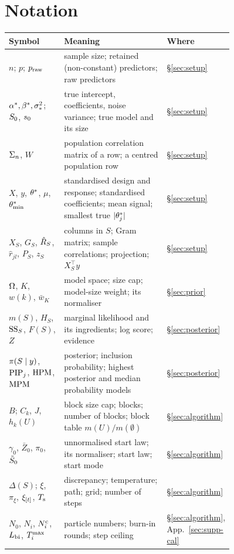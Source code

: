 \section{Notation}\label{app:notation}

{\small
\begin{longtable}{@{}p{0.26\linewidth}p{0.5\linewidth}l@{}}
\toprule
Symbol & Meaning & Where \\ \midrule \endhead
$n$; $p$; $p_{\mathrm{raw}}$ & sample size; retained (non-constant) predictors; raw predictors & \S\ref{sec:setup} \\
$\alpha^*,\beta^*,\sigma_*^2$; $S_0$, $s_0$ & true intercept, coefficients, noise variance; true model and its size & \S\ref{sec:setup} \\
$\Sigma_n$, $W$ & population correlation matrix of a row; a centred population row & \S\ref{sec:setup} \\
$X$, $y$, $\theta^*$, $\mu$, $\theta^*_{\min}$ & standardised design and response; standardised coefficients; mean signal; smallest true $\lvert \theta^*_j\rvert$ & \S\ref{sec:setup} \\
$X_S$, $G_S$, $\hat R_S$, $\hat r_{jl}$, $P_S$, $z_S$ & columns in $S$; Gram matrix; sample correlations; projection; $X_S^\top y$ & \S\ref{sec:setup} \\
$\Omega$, $K$, $w(k)$, $\bar w_K$ & model space; size cap; model-size weight; its normaliser & \S\ref{sec:prior} \\
$m(S)$, $H_S$, $\mathrm{SS}_S$, $F(S)$, $Z$ & marginal likelihood and its ingredients; log score; evidence & \S\ref{sec:posterior} \\
$\pi(S\mid y)$, $\mathrm{PIP}_j$, $\mathrm{HPM}$, $\mathrm{MPM}$ & posterior; inclusion probability; highest posterior and median probability models & \S\ref{sec:posterior} \\
$B$; $C_k$, $J$, $h_k(U)$ & block size cap; blocks; number of blocks; block table $m(U)/m(\emptyset)$ & \S\ref{sec:algorithm} \\
$\gamma_0$, $\bar Z_0$, $\pi_0$, $\tilde S_0$ & unnormalised start law; its normaliser; start law; start mode & \S\ref{sec:algorithm} \\
$\Delta(S)$; $\xi$, $\pi_\xi$, $\xi_{[t]}$, $T_{\mathrm s}$ & discrepancy; temperature; path; grid; number of steps & \S\ref{sec:algorithm} \\
$N_0$, $N_i$, $N^{\mathrm c}_i$, $L_{\mathrm{bi}}$, $T^{\max}_i$ & particle numbers; burn-in rounds; step ceiling & \S\ref{sec:algorithm}, App.~\ref{sec:supp-cal} \\

\end{longtable}}
